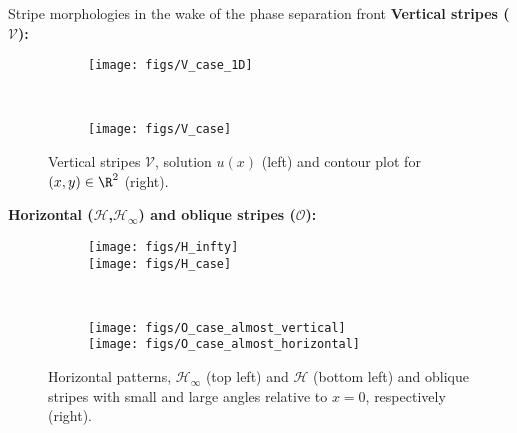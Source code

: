 \documentclass[final]{beamer}
\newlength{\onecolwid}
\begin{document}
\begin{frame}[t]
\begin{columns}[t]
\begin{column}{\onecolwid}
\begin{block}{Stripe morphologies in the wake of the phase separation front}
\indent \textbf{Vertical stripes ($\mathcal{V}$):}

\begin{figure}[htb]
    \centering
    \begin{subfigure}[b]{0.45\textwidth}
          \centering
          \texttt{[image: figs/V\_case\_1D]}
    \end{subfigure}
    ~ %
    \begin{subfigure}[b]{0.45\textwidth}
    \centering
    \texttt{[image: figs/V\_case]}
        \end{subfigure}
    \caption{Vertical stripes $\mathcal{V}$, solution $u(x)$ (left) and contour plot  for $(x,y)\in\R^2$ (right). \label{Figure_1-vertical}}
\end{figure}

\indent  \textbf{Horizontal ($\mathcal{H}$,$\mathcal{H_\infty}$) and oblique stripes ($\mathcal{O}$):}

\begin{figure}[htb]
    \centering
    \begin{subfigure}[b]{0.45\textwidth}
          \centering
          \texttt{[image: figs/H\_infty]}\\[0.2in]
          \texttt{[image: figs/H\_case]}
              \end{subfigure}
    ~ %
    \begin{subfigure}[b]{0.45\textwidth}
    \centering
    \texttt{[image: figs/O\_case\_almost\_vertical]}\\[0.2in]
    \texttt{[image: figs/O\_case\_almost\_horizontal]}
        \end{subfigure}
    \caption{Horizontal patterns,  $\mathcal{H_\infty}$ (top left) and  $\mathcal{H}$ (bottom left)  and  oblique stripes with small and large angles relative to $x=0$, respectively (right). \label{Figure_1-horizontal}}
\end{figure}


\end{block}
\end{column}
\end{columns}
\end{frame}
\end{document}
